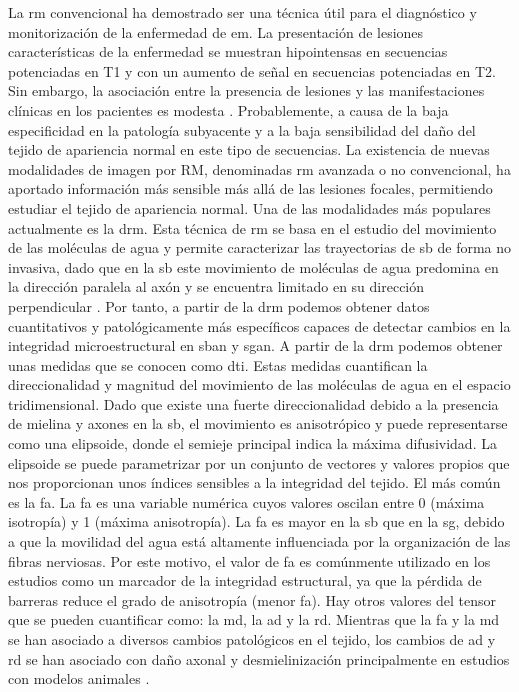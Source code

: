 La \gls{rm} convencional ha demostrado ser una  técnica útil para el diagnóstico y monitorización de la enfermedad de \gls{em}.  La presentación de lesiones características de la enfermedad se muestran hipointensas en secuencias potenciadas en T1 y con un aumento de señal en secuencias potenciadas en T2. Sin embargo, la asociación entre la presencia de lesiones y las manifestaciones clínicas en los pacientes es modesta \cite{Barkhof2002TheRevisited}. Probablemente, a causa de la baja especificidad en la patología subyacente y a la baja sensibilidad del daño del tejido de apariencia normal en este tipo de secuencias.  La existencia de nuevas modalidades de imagen por RM, denominadas \gls{rm} avanzada o no convencional, ha aportado información más sensible más allá de las lesiones focales, permitiendo estudiar el tejido de apariencia normal. Una de las modalidades más populares actualmente es la \gls{drm}. Esta técnica de \gls{rm} se basa en el estudio del movimiento de las moléculas de agua y permite caracterizar las trayectorias de \gls{sb} de forma no invasiva, dado que en la \gls{sb} este movimiento de moléculas de agua predomina en la dirección paralela al axón y se encuentra limitado en su dirección perpendicular \cite{Basser2000InDatab}.  Por tanto, a partir de la \gls{drm} podemos obtener datos cuantitativos y patológicamente más específicos capaces de detectar cambios en la integridad microestructural en \gls{sban} y \gls{sgan}. A partir de la \gls{drm} podemos obtener unas medidas que se conocen como \gls{dti}. Estas medidas cuantifican la direccionalidad y magnitud del movimiento de las moléculas de agua en el espacio tridimensional. Dado que existe una fuerte direccionalidad debido a la presencia de mielina y axones en la \gls{sb}, el movimiento es anisotrópico y puede representarse como una elipsoide, donde el semieje principal indica la máxima difusividad. La elipsoide se puede parametrizar por un conjunto de vectores y valores propios que nos proporcionan unos índices sensibles a la integridad del tejido. El más común es la \gls{fa}. La \gls{fa} es una variable numérica cuyos valores oscilan entre 0 (máxima isotropía) y 1 (máxima anisotropía). La \gls{fa} es mayor en la \gls{sb} que en la \gls{sg}, debido a que la movilidad del agua está altamente influenciada por la organización de las fibras nerviosas. Por este motivo, el valor de \gls{fa} es comúnmente utilizado en los estudios como un marcador de la integridad estructural, ya que la pérdida de barreras reduce el grado de anisotropía (menor \gls{fa}). Hay otros valores del tensor que se pueden cuantificar como: la \gls{md}, la \gls{ad} y la \gls{rd}. Mientras que la \gls{fa} y la \gls{md} se han asociado a diversos cambios patológicos en el tejido, los cambios de \gls{ad} y \gls{rd} se han asociado con daño axonal y desmielinización principalmente en estudios con modelos animales \cite{Song2005DemyelinationBrain}.

